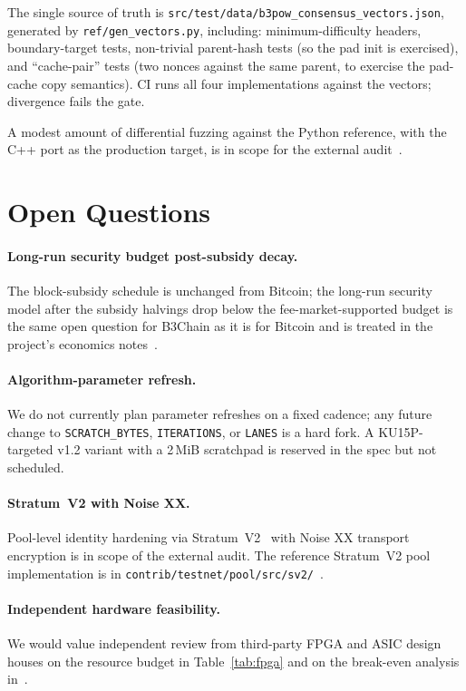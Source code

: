 \documentclass[11pt,a4paper]{article}
\theoremstyle{plain}
\theoremstyle{definition}
\theoremstyle{remark}
\begin{document}
The single source of truth is
\texttt{src/test/data/b3pow\_consensus\_vectors.json}, generated by
\texttt{ref/gen\_vectors.py}, including: minimum-difficulty headers,
boundary-target tests, non-trivial parent-hash tests (so the pad
init is exercised), and ``cache-pair'' tests (two nonces against
the same parent, to exercise the pad-cache copy semantics). CI
runs all four implementations against the vectors; divergence fails
the gate.

A modest amount of differential fuzzing against the Python
reference, with the C++ port as the production target, is in scope
for the external audit~\cite{b3chain-auditscope}.

\section{Open Questions}\label{sec:openq}

\paragraph{Long-run security budget post-subsidy decay.} The
block-subsidy schedule is unchanged from Bitcoin; the long-run
security model after the subsidy halvings drop below the
fee-market-supported budget is the same open question for B3Chain
as it is for Bitcoin and is treated in the project's economics
notes~\cite{b3chain-securitybudget}.

\paragraph{Algorithm-parameter refresh.} We do not currently plan
parameter refreshes on a fixed cadence; any future change to
\texttt{SCRATCH\_BYTES}, \texttt{ITERATIONS}, or \texttt{LANES} is
a hard fork. A KU15P-targeted v1.2 variant with a 2\,MiB scratchpad
is reserved in the spec but not scheduled.

\paragraph{Stratum~V2 with Noise XX.} Pool-level identity hardening
via Stratum~V2~\cite{stratumv2} with Noise XX transport encryption is
in scope of the external audit. The reference Stratum~V2 pool
implementation is in
\texttt{contrib/testnet/pool/src/sv2/}~\cite{b3chain-spec}.

\paragraph{Independent hardware feasibility.} We would value
independent review from third-party FPGA and ASIC design houses on
the resource budget in Table~\ref{tab:fpga} and on the
break-even analysis in~\cite{b3chain-asic}.
\end{document}
